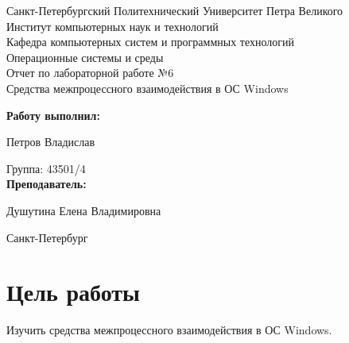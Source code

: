 \documentclass[a4paper]{article}
\begin{document}
\begin{titlepage} %

\begin{center} %

\large Санкт-Петербургский Политехнический Университет Петра Великого\\
\large Институт компьютерных наук и технологий \\
\large Кафедра компьютерных систем и программных технологий\\[6cm]

\huge Операционные системы и среды\\[0.5cm]
\large Отчет по лабораторной работе №6\\[0.1cm]
\large Средства межпроцессного взаимодействия в ОС Windows\\[5cm]
\end{center}

\begin{flushright}
\begin{minipage}{0.5\textwidth}
\begin{flushright}
\textbf{Работу выполнил:}

Петров Владислав

{Группа:} 43501/4\\


\textbf{Преподаватель:} 

Душутина Елена Владимировна
\end{flushright}
\end{minipage} %
\end{flushright} %

\vfill %

\begin{center}

\large Санкт-Петербург\\
\large \the\year %

\end{center} %

\thispagestyle{empty} %
\end{titlepage} %

\vfill %


\section{Цель работы}
	Изучить средства межпроцессного взаимодействия в ОС Windows.
	
\end{document}
